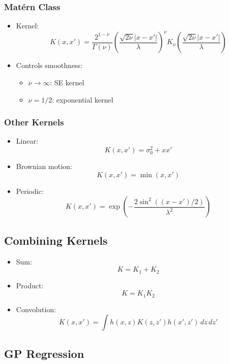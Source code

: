 \documentclass[12pt,oneside]{book}
\numberwithin{equation}{section}
\theoremstyle{definition}
\theoremstyle{plain}
\theoremstyle{remark}
\begin{document}
\subsubsection*{Matérn Class}
\begin{itemize}
\item Kernel:
\[
K(x,x') =
\frac{2^{1-\nu}}{\Gamma(\nu)}
\left(\frac{\sqrt{2\nu}|x-x'|}{\lambda}\right)^\nu
K_\nu\left(\frac{\sqrt{2\nu}|x-x'|}{\lambda}\right)
\]

\item Controls smoothness:
\begin{itemize}
\item $\nu \to \infty$: SE kernel
\item $\nu = 1/2$: exponential kernel
\end{itemize}
\end{itemize}

\subsubsection*{Other Kernels}
\begin{itemize}
\item Linear:
\[
K(x,x') = \sigma_0^2 + x x'
\]

\item Brownian motion:
\[
K(x,x') = \min(x,x')
\]

\item Periodic:
\[
K(x,x') = \exp\left(-\frac{2\sin^2((x-x')/2)}{\lambda^2}\right)
\]
\end{itemize}

\subsection{Combining Kernels}

\begin{itemize}
\item Sum:
\[
K = K_1 + K_2
\]

\item Product:
\[
K = K_1 K_2
\]

\item Convolution:
\[
K(x,x') = \int h(x,z) K(z,z') h(x',z')\, dz\, dz'
\]
\end{itemize}

\subsection{GP Regression}
\end{document}
